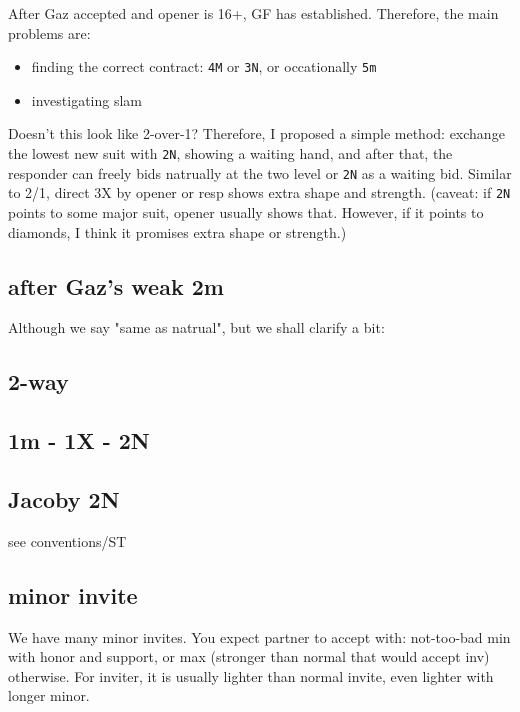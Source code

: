 After Gaz accepted and opener is 16+, GF has established. Therefore, the main problems are: 

\begin{itemize}
    \setlength\itemsep{0pt}
    \item finding the correct contract: \texttt{4M} or \texttt{3N}, or occationally \texttt{5m}
    \item investigating slam
\end{itemize}

Doesn't this look like 2-over-1? Therefore, I proposed a simple method: 
exchange the lowest new suit with \texttt{2N}, showing a waiting hand, and after that, the responder can freely bids natrually at the two level or \texttt{2N} as a waiting bid.
Similar to 2/1, direct 3X by opener or resp shows extra shape and strength. (caveat: if \texttt{2N} points to some major suit, opener usually shows that. However, if it points to diamonds, I think it promises extra shape or strength.)


\subsection{after Gaz's weak 2m}

Although we say "same as natrual", but we shall clarify a bit:


\subsection{2-way}


\subsection{1m - 1X - 2N}


\subsection{Jacoby 2N}

see {\color{blue} conventions/ST}

\subsection{minor invite}

We have many minor invites. You expect partner to accept with:
not-too-bad min with honor and support, or max (stronger than normal that would accept inv) otherwise. 
For inviter, it is usually lighter than normal invite, even lighter with longer minor.



